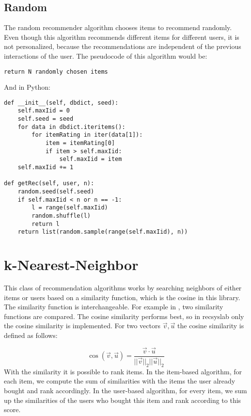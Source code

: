 \subsection{Random}

The random recommender algorithm chooses items to recommend randomly.
Even though this algorithm recommends different items for different
users, it is not personalized, because the recommendations are
independent of the previous interactions of the user.
The pseudocode of this algorithm would be:
\begin{lstlisting}[style=pseudocode]
return N randomly chosen items
\end{lstlisting}
And in Python:
\begin{lstlisting}[style=python]
def __init__(self, dbdict, seed):
    self.maxIid = 0
    self.seed = seed
    for data in dbdict.iteritems():
        for itemRating in iter(data[1]):
            item = itemRating[0]
            if item > self.maxIid:
                self.maxIid = item
    self.maxIid += 1

def getRec(self, user, n):
    random.seed(self.seed)
    if self.maxIid < n or n == -1:
        l = range(self.maxIid)
        random.shuffle(l)
        return l
    return list(random.sample(range(self.maxIid), n))
\end{lstlisting}


\section{k-Nearest-Neighbor}

This class of recommendation algorithms works by searching neighbors
of either items or users based on a similarity function, which is the
cosine in this library. The similarity function is interchangeable. 
For example in
\cite{Karypis:2001:EIT:502585.502627}, two similarity functions are
compared. The cosine similarity performs best, so in recsyslab only the cosine similarity
is implemented. For two vectors \(\vec{v},\vec{u}\)
the cosine similarity is defined as follows:

\begin{equation}
\cos(\vec{v}, \vec{u})=\frac{\vec{v} \cdot \vec{u}}{||\vec{v}||_{2} ||\vec{u}||_{2}}
\end{equation}
With the similarity it is possible to rank items.
In the item-based algorithm, for each item, we compute the sum of 
similarities with the items the user already bought and rank 
accordingly.
In the user-based algorithm, for every item, we sum up the 
similarities of the users who bought this item and rank
according to this score.



